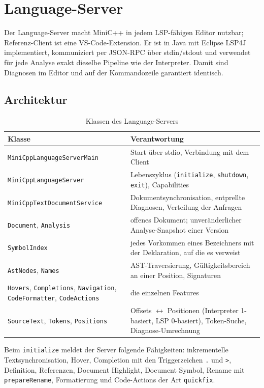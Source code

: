 \documentclass[11pt,a4paper,parskip=half,headsepline,toc=flat]{scrartcl}
\newcommand{\code}[1]{\texttt{#1}}
\newcommand{\thead}{\rowcolor{headbg}}
\newcommand{\hcell}[1]{\textbf{\color{navy}#1}}
\newenvironment{reporttable}[1][]%
  {\begin{table}[htbp]\centering\small\renewcommand{\arraystretch}{1.25}\rowcolors{2}{white}{zebra}}%
  {\end{table}}
\begin{document}
\section{Language-Server}\label{sec:lsp}
Der Language-Server macht MiniC++ in jedem LSP-fähigen Editor nutzbar; Referenz-Client ist eine VS-Code-Extension. Er
ist in Java mit Eclipse LSP4J implementiert, kommuniziert per JSON-RPC über stdin/stdout und verwendet für jede
Analyse exakt dieselbe Pipeline wie der Interpreter. Damit sind Diagnosen im Editor und auf der Kommandozeile
garantiert identisch.

\subsection{Architektur}
\begin{reporttable}
\begin{tabular}{L{0.4}L{0.52}}
\thead \hcell{Klasse} & \hcell{Verantwortung} \\ \midrule
\code{MiniCppLanguageServerMain} & Start über stdio, Verbindung mit dem Client \\
\code{MiniCppLanguageServer} & Lebenszyklus (\code{initialize}, \code{shutdown}, \code{exit}), Capabilities \\
\code{MiniCppTextDocumentService} & Dokumentsynchronisation, entprellte Diagnosen, Verteilung der Anfragen \\
\code{Document}, \code{Analysis} & offenes Dokument; unveränderlicher Analyse-Snapshot einer Version \\
\code{SymbolIndex} & jedes Vorkommen eines Bezeichners mit der Deklaration, auf die es verweist \\
\code{AstNodes}, \code{Names} & AST-Traversierung, Gültigkeitsbereich an einer Position, Signaturen \\
\code{Hovers}, \code{Completions}, \code{Navigation}, \code{CodeFormatter}, \code{CodeActions} & die einzelnen
  Features \\
\code{SourceText}, \code{Tokens}, \code{Positions} & Offsets $\leftrightarrow$ Positionen (Interpreter 1-basiert,
  LSP 0-basiert), Token-Suche, Diagnose-Umrechnung \\ \bottomrule
\end{tabular}
\caption{Klassen des Language-Servers}
\end{reporttable}

Beim \code{initialize} meldet der Server folgende Fähigkeiten: inkrementelle Textsynchronisation, Hover, Completion
mit den Triggerzeichen \code{.} und \code{>}, Definition, Referenzen, Document Highlight, Document Symbol, Rename mit
\code{prepareRename}, Formatierung und Code-Actions der Art \code{quickfix}.
\end{document}
